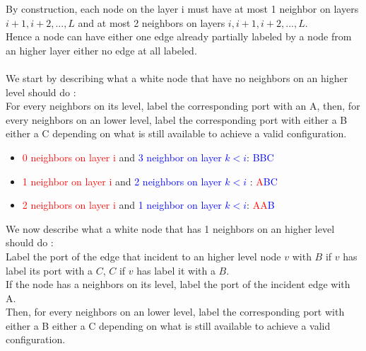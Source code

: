 By construction, each node on the layer i must have at most 1 neighbor on layers $i+1,i+2,...,L$  and at most 2 neighbors on layers $i,i+1,i+2,...,L$.\\
Hence a node can have either one edge already partially labeled by a node from an higher layer either no edge at all labeled.\\\\
We start by describing what a white node that have no neighbors on an higher level should do :\\
For every neighbors on its level, label the corresponding port with an A, then, for every neighbors on an lower level, label the corresponding port with either a B either a C depending on what is still available to achieve a valid configuration.
\begin{itemize}
    \item \textcolor{red}{0 neighbors on layer i} and \textcolor{blue}{3 neighbor on layer $k<i$}: \textcolor{blue}{BBC}
    \item \textcolor{red}{1 neighbor on layer i} and \textcolor{blue}{2 neighbors on layer $k<i$} : \textcolor{red}{A}\textcolor{blue}{BC}
    \item \textcolor{red}{2 neighbors on layer i} and \textcolor{blue}{1 neighbor on layer $k<i$}: \textcolor{red}{AA}\textcolor{blue}{B}
\end{itemize}
We now describe what a white node that has 1 neighbors on an higher level should do :\\
Label the port of the edge that incident to an higher level node $v$ with $B$ if $v$ has label its port with a $C$, $C$ if $v$ has label it with a $B$.\\
If the node has a neighbors on its level, label the port of the incident edge with A.\\ Then, for every neighbors on an lower level, label the corresponding port with either a B either a C depending on what is still available to achieve a valid configuration.
